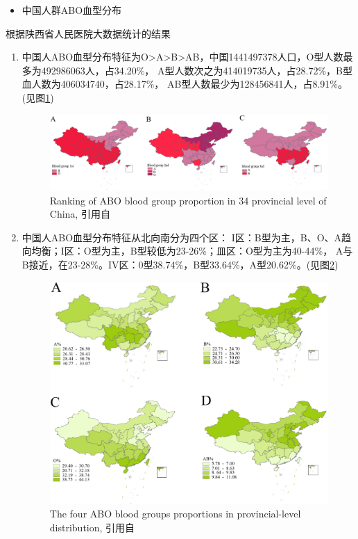 \documentclass[AutoFakeBold]{LZUThesis}
\begin{document}
\begin{itemize}
    \item 中国人群ABO血型分布\par
\end{itemize}

根据陕西省人民医院大数据统计的结果\cite{WOS:000879413200018}
\begin{enumerate}
    \item 中国人ABO血型分布特征为O>A>B>AB，中国1441497378人口，O型人数最多为492986063人，占34.20\%，
    A型人数次之为414019735人，占28.72\%，B型血人数为406034740，占28.17\%，
    AB型人数最少为128456841人，占8.91\%。(见图\ref{fig:ChinaABO-1})

    \begin{figure}[H]
        \centering
        \includegraphics[width=350pt]{./img/Ranking of ABO blood group proportion in 34 provincial level of China.jpg}
        \caption{Ranking of ABO blood group proportion in 34 provincial level of China, 引用自\cite{WOS:000879413200018}}
        \label{fig:ChinaABO-1}
    \end{figure}

    \item 中国人ABO血型分布特征从北向南分为四个区：
    I区：B型为主，B、O、A趋向均衡；I区：O型为主，B型较低为23-26\%；皿区：O型为主为40-44\%，
    A与B接近，在23-28\%。IV区：0型38.74\%，B型33.64\%，A型20.62\%。(见图\ref{fig:ChinaABO-2})

    \begin{figure}[H]
        \centering
        \includegraphics[width=350pt]{./img/The four ABO blood groups proportions in provincial-level distribution.jpg}
        \caption{The four ABO blood groups proportions in provincial-level distribution, 引用自\cite{WOS:000879413200018}}
        \label{fig:ChinaABO-2}
    \end{figure}


\end{enumerate}
\end{document}
